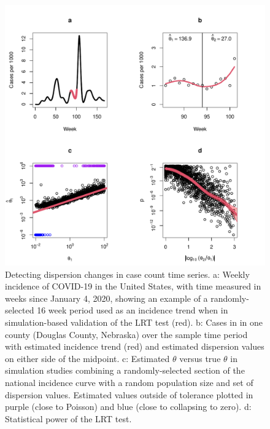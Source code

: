 \documentclass[11pt,letterpaper]{article}
\begin{document}
\begin{Abstract}
\clearpage
\begin{figure}[!ht]
\includegraphics[width=1\textwidth]{fig1}
\caption{
Detecting dispersion changes in case count time series. 
a: Weekly incidence of COVID-19 in the United States, with time measured in weeks since January 4, 2020, showing an example of a randomly-selected 16 week period used as an incidence trend when in simulation-based validation of the LRT test (red). 
b: Cases in in one county (Douglas County, Nebraska) over the sample time period with estimated incidence trend (red) and estimated dispersion values on either side of the midpoint. 
c: Estimated $\theta$ versus true $\theta$ in simulation studies combining a randomly-selected section of the national incidence curve with a random population size and set of dispersion values. Estimated values outside of tolerance plotted in purple (close to Poisson) and blue (close to collapsing to zero). 
d: Statistical power of the LRT test.}\label{fig1}
\end{figure}
\clearpage



\end{Abstract}
\end{document}
